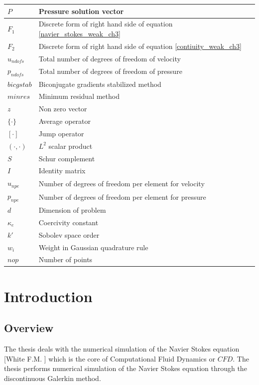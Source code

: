 \documentclass[a4paper,openany]{book}
\begin{document}
\begin{longtable}{| p{} | p{} |}
\hline
$P$ & Pressure solution vector\\
\hline
$F_1$ & Discrete form of right hand side of equation \eqref{navier_stokes_weak_ch3}\\
\hline
$F_2$ & Discrete form of right hand side of equation \eqref{contiuity_weak_ch3}\\
\hline
$u_{ndofs}$ & Total number of degrees of freedom of velocity\\
\hline
$p_{ndofs}$ & Total number of degrees of freedom of pressure\\
\hline
$bicgstab$ & Biconjugate gradients stabilized method\\
\hline
$minres$ & Minimum residual method\\
\hline
$z$ & Non zero vector\\
\hline
$\lbrace \cdot \rbrace$ & Average operator\\
\hline
$[\cdot]$ & Jump operator\\
\hline
$(\cdot,\cdot)$ & $L^2$ scalar product\\
\hline
$S$ & Schur complement\\
\hline
$I$ & Identity matrix\\
\hline
$u_{npe}$ & Number of degrees of freedom per element for velocity\\
\hline
$p_{npe}$ & Number of degrees of freedom per element for pressure\\
\hline
$d$ & Dimension of problem\\
\hline
$\kappa_e$ & Coercivity constant\\
\hline
$k'$ & Sobolev space order\\
\hline
$w_i$ & Weight in Gaussian quadrature rule\\
\hline
$nop$ & Number of points\\
\hline
\end{longtable}
\listoffigures
\listoftables

\tableofcontents

\chapter{Introduction}

\section{Overview}

The thesis deals with the numerical simulation of the Navier Stokes equation [White F.M. \cite{white}] which is the core of Computational Fluid Dynamics or $CFD$. The thesis performs numerical simulation of the Navier Stokes equation through the discontinuous Galerkin method.
\end{document}
